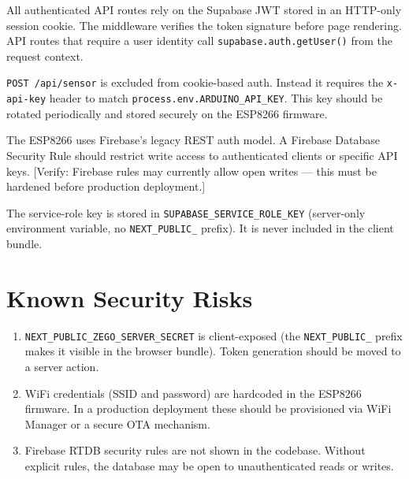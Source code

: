 \documentclass[12pt,a4paper]{report}
\begin{document}
\begin{description}[leftmargin=0em, itemsep=0.4em]
  \item[Browser $\to$ API]
    All authenticated API routes rely on the Supabase JWT stored in
    an HTTP-only session cookie. The middleware verifies the token
    signature before page rendering. API routes that require a user
    identity call \texttt{supabase.auth.getUser()} from the request
    context.

  \item[Hardware $\to$ API]
    \texttt{POST /api/sensor} is excluded from cookie-based auth.
    Instead it requires the \texttt{x-api-key} header to match
    \texttt{process.env.ARDUINO\_API\_KEY}. This key should be rotated
    periodically and stored securely on the ESP8266 firmware.

  \item[ESP8266 $\to$ Firebase]
    The ESP8266 uses Firebase's legacy REST auth model. A Firebase
    Database Security Rule should restrict write access to authenticated
    clients or specific API keys.
    [Verify: Firebase rules may currently allow open writes ---
    this must be hardened before production deployment.]

  \item[Server $\to$ Supabase Admin]
    The service-role key is stored in \texttt{SUPABASE\_SERVICE\_ROLE\_KEY}
    (server-only environment variable, no \texttt{NEXT\_PUBLIC\_} prefix).
    It is never included in the client bundle.
\end{description}

\section{Known Security Risks}

\begin{enumerate}[leftmargin=1.5em]
  \item \texttt{NEXT\_PUBLIC\_ZEGO\_SERVER\_SECRET} is client-exposed
        (the \texttt{NEXT\_PUBLIC\_} prefix makes it visible in the
        browser bundle). Token generation should be moved to a server
        action.

  \item WiFi credentials (SSID and password) are hardcoded in the
        ESP8266 firmware. In a production deployment these should be
        provisioned via WiFi Manager or a secure OTA mechanism.

  \item Firebase RTDB security rules are not shown in the codebase.
        Without explicit rules, the database may be open to
        unauthenticated reads or writes.
\end{enumerate}
\end{document}
